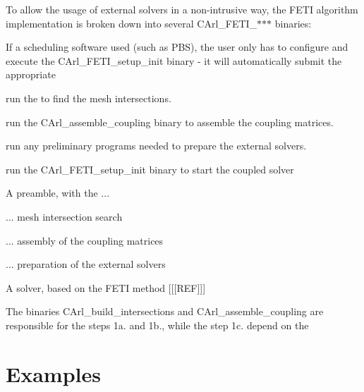 To allow the usage of external solvers in a non-\/intrusive way, the F\+E\+T\+I algorithm implementation is broken down into several {\ttfamily C\+Arl\+\_\+\+F\+E\+T\+I\+\_\+$\ast$$\ast$$\ast$} binaries\+:


\begin{DoxyEnumerate}
\item 
\end{DoxyEnumerate}

If a scheduling software used (such as P\+B\+S), the user only has to configure and execute the {\ttfamily C\+Arl\+\_\+\+F\+E\+T\+I\+\_\+setup\+\_\+init} binary -\/ it will automatically submit the appropriate


\begin{DoxyEnumerate}
\item run the to find the mesh intersections.
\item run the {\ttfamily C\+Arl\+\_\+assemble\+\_\+coupling} binary to assemble the coupling matrices.
\item run any preliminary programs needed to prepare the external solvers.
\item run the {\ttfamily C\+Arl\+\_\+\+F\+E\+T\+I\+\_\+setup\+\_\+init} binary to start the coupled solver
\end{DoxyEnumerate}
\begin{DoxyEnumerate}
\item A preamble, with the ...
\begin{DoxyEnumerate}
\item ... mesh intersection search
\item ... assembly of the coupling matrices
\item ... preparation of the external solvers
\end{DoxyEnumerate}
\item A solver, based on the F\+E\+T\+I method \mbox{[}\mbox{[}\mbox{[}R\+E\+F\mbox{]}\mbox{]}\mbox{]}
\end{DoxyEnumerate}

The binaries {\ttfamily C\+Arl\+\_\+build\+\_\+intersections} and {\ttfamily C\+Arl\+\_\+assemble\+\_\+coupling} are responsible for the steps 1a. and 1b., while the step 1c. depend on the

 \hypertarget{cpp_examples}{}\section{Examples}\label{cpp_examples}
